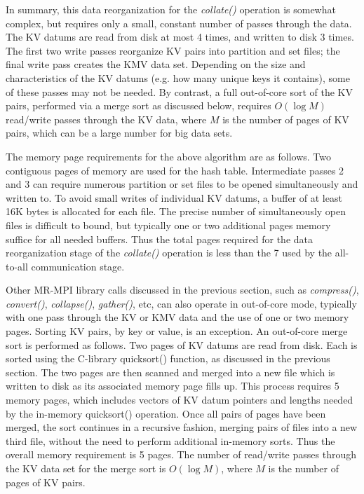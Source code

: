 In summary, this data reorganization for the {\it collate()} operation
is somewhat complex, but requires only a small, constant number of
passes through the data.  The KV datums are read from disk at most 4
times, and written to disk 3 times.  The first two write passes
reorganize KV pairs into partition and set files; the final write pass
creates the KMV data set.  Depending on the size and characteristics
of the KV datums (e.g. how many unique keys it contains), some of
these passes may not be needed.  By contrast, a full out-of-core sort
of the KV pairs, performed via a merge sort as discussed below,
requires $O(\log{M})$ read/write passes through the KV data, where $M$
is the number of pages of KV pairs, which can be a large number for
big data sets.

The memory page requirements for the above algorithm are as follows.
Two contiguous pages of memory are used for the hash table.
Intermediate passes 2 and 3 can require numerous partition or set
files to be opened simultaneously and written to.  To avoid small
writes of individual KV datums, a buffer of at least 16K bytes is
allocated for each file.  The precise number of simultaneously open
files is difficult to bound, but typically one or two additional pages
memory suffice for all needed buffers.  Thus the total pages required
for the data reorganization stage of the {\it collate()} operation is
less than the 7 used by the all-to-all communication stage.

Other MR-MPI library calls discussed in the previous section, such as
{\it compress()}, {\it convert()}, {\it collapse()}, {\it gather()},
etc, can also operate in out-of-core mode, typically with one pass
through the KV or KMV data and the use of one or two memory pages.
Sorting KV pairs, by key or value, is an exception.  An out-of-core
merge sort is performed as follows.  Two pages of KV datums are read
from disk.  Each is sorted using the C-library quicksort() function,
as discussed in the previous section.  The two pages are then scanned
and merged into a new file which is written to disk as its associated
memory page fills up.  This process requires 5 memory pages, which
includes vectors of KV datum pointers and lengths needed by the
in-memory quicksort() operation.  Once all pairs of pages have been
merged, the sort continues in a recursive fashion, merging pairs of
files into a new third file, without the need to perform additional
in-memory sorts.  Thus the overall memory requirement is 5 pages.  The
number of read/write passes through the KV data set for the merge sort
is $O(\log{M})$, where $M$ is the number of pages of KV pairs.
